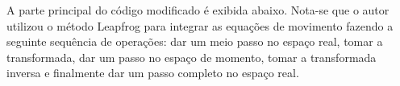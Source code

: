 A parte principal do código modificado é exibida abaixo. Nota-se que o autor utilizou o método Leapfrog para integrar as equações de movimento fazendo a seguinte sequência de operações: dar um meio passo no espaço real, tomar a transformada, dar um passo no espaço de momento, tomar a transformada inversa e finalmente dar um passo completo no espaço real. 

